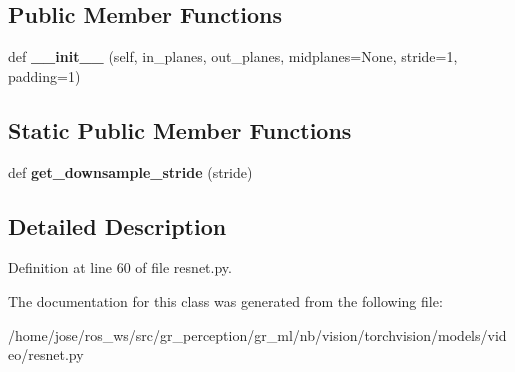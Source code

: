 \subsection*{Public Member Functions}
\begin{DoxyCompactItemize}
\item 
\mbox{\label{classtorchvision_1_1models_1_1video_1_1resnet_1_1Conv3DNoTemporal_a55c79f6decf41e5a5a9ae946751afcf7}} 
def {\bfseries \+\_\+\+\_\+init\+\_\+\+\_\+} (self, in\+\_\+planes, out\+\_\+planes, midplanes=None, stride=1, padding=1)
\end{DoxyCompactItemize}
\subsection*{Static Public Member Functions}
\begin{DoxyCompactItemize}
\item 
\mbox{\label{classtorchvision_1_1models_1_1video_1_1resnet_1_1Conv3DNoTemporal_aea9c49650d2c01641ba06e3578cf87a0}} 
def {\bfseries get\+\_\+downsample\+\_\+stride} (stride)
\end{DoxyCompactItemize}


\subsection{Detailed Description}


Definition at line 60 of file resnet.\+py.



The documentation for this class was generated from the following file\+:\begin{DoxyCompactItemize}
\item 
/home/jose/ros\+\_\+ws/src/gr\+\_\+perception/gr\+\_\+ml/nb/vision/torchvision/models/video/resnet.\+py\end{DoxyCompactItemize}
